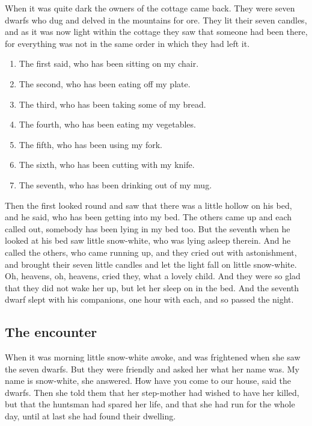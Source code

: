 \documentclass[a4paper,11pt]{article}
\begin{document}
When it was quite dark the owners of the cottage came back.
They were seven dwarfs who dug and delved in the mountains for
ore.  They lit their seven candles, and as it was now light within
the cottage they saw that someone had been there, for everything
was not in the same order in which they had left it.


\begin{enumerate}
\item The first said, who has been sitting on my chair.
\item The second, who has been eating off my plate.
\item The third, who has been taking some of my bread.
\item The fourth, who has been eating my vegetables.
\item The fifth, who has been using my fork.
\item The sixth, who has been cutting with my knife.
\item The seventh, who has been drinking out of my mug.
\end{enumerate}

Then the first looked round and saw that there was a little
hollow on his bed, and he said, who has been getting into my
bed.  The others came up and each called out, somebody has been
lying in my bed too.  But the seventh when he looked at his bed
saw little snow-white, who was lying asleep therein.  And he
called the others, who came running up, and they cried out with
astonishment, and brought their seven little candles and let the
light fall on little snow-white.  Oh, heavens, oh, heavens, cried
they, what a lovely child.  And they were so glad that they did
not wake her up, but let her sleep on in the bed.  And the
seventh dwarf slept with his companions, one hour with each, and
so passed the night.


\subsection{The encounter}

When it was morning little snow-white awoke, and was frightened
when she saw the seven dwarfs.  But they were friendly and asked
her what her name was.  My name is snow-white, she answered.
How have you come to our house, said the dwarfs.  Then she told
them that her step-mother had wished to have her killed, but
that the huntsman had spared her life, and that she had run for
the whole day, until at last she had found their dwelling.
\end{document}
